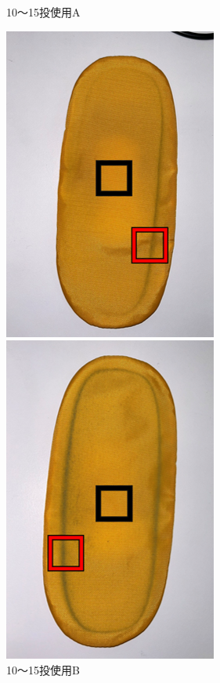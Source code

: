 \documentclass[main]{subfiles}
\begin{document}
\begin{figure}[htbp]
\begin{minipage}[htbp]{0.3\linewidth}
        \caption{10～15投使用A}
        \label{fig:label}
    \end{minipage}
    \begin{minipage}[htbp]{0.3\linewidth}
        \centering
        \includegraphics[keepaspectratio, width=0.8\linewidth, height=\linewidth]{figures/caring_brush_pad/10~15B.png}
        \caption{10～15投使用B}
        \label{fig:label}
    \end{minipage}
    \begin{minipage}[htbp]{0.3\linewidth}
        \centering
        \includegraphics[keepaspectratio, width=0.8\linewidth, height=\linewidth]{figures/caring_brush_pad/chouki.png}

\end{minipage}
\end{figure}
\end{document}
